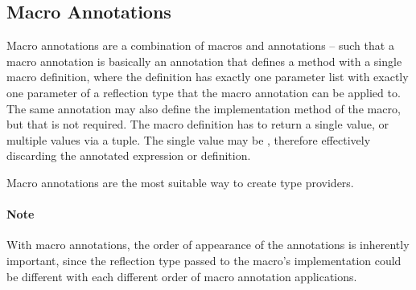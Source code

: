 \subsection{Macro Annotations}
\label{sec:macro-annotations}

Macro annotations are a combination of macros and annotations -- such that a macro annotation is basically an annotation that defines a method  with a single macro definition, where the definition has exactly one parameter list with exactly one parameter of a reflection type that the macro annotation can be applied to. The same annotation may also define the implementation method of the macro, but that is not required. The macro definition has to return a single value, or multiple values via a tuple. The single value may be , therefore effectively discarding the annotated expression or definition. 

Macro annotations are the most suitable way to create type providers. 

\paragraph{Note}
With macro annotations, the order of appearance of the annotations is inherently important, since the reflection type passed to the macro's implementation could be different with each different order of macro annotation applications. 






